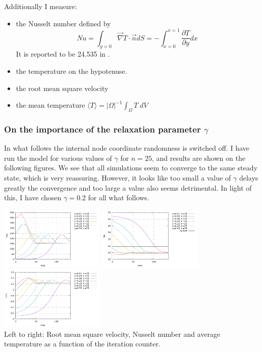 Additionally I measure:
\begin{itemize}
\item the Nusselt number defined by 
\[
Nu
=\int_{y=0} \vec{\nabla}T \cdot \vec{n} dS  
=-\int_{x=0}^{x=1} \frac{\partial T}{\partial y} dx 
\]
It is reported to be 24.535 in \cite{jolm17}.
\item the temperature on the hypotenuse.
\item the root mean square velocity
\item the mean temperature $\langle T \rangle = |\Omega|^{-1} \int_\Omega T \; dV$
\end{itemize}

\subsubsection*{On the importance of the relaxation parameter $\gamma$}

In what follows the internal node coordinate randomness is switched off.
I have run the model for various values of $\gamma$ for $n=25$, and results are shown on the 
following figures. We see that all simulations seem to converge to the same 
steady state, which is very reassuring. However, it looks like too small a value of $\gamma$
delays greatly the convergence and too large a value also seems detrimental. 
In light of this, I have chosen $\gamma=0.2$ for all what follows.

\begin{center}
\includegraphics[width=5cm]{python_codes/fieldstone_51/images/vrms_gammas.pdf}
\includegraphics[width=5cm]{python_codes/fieldstone_51/images/Nu_gammas.pdf}
\includegraphics[width=5cm]{python_codes/fieldstone_51/images/avrgT_gammas.pdf}\\
{\small Left to right: Root mean square velocity, Nusselt number and average temperature as a function 
of the iteration counter.}
\end{center}

